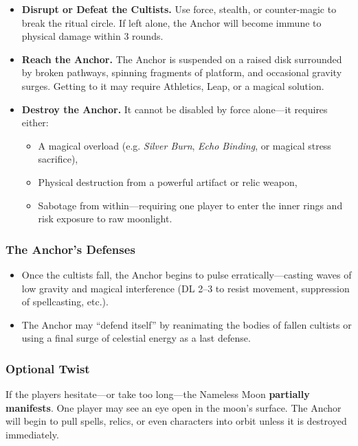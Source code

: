 \begin{itemize}
  \item \textbf{Disrupt or Defeat the Cultists.} Use force, stealth, or counter-magic to break the ritual circle. If left alone, the Anchor will become immune to physical damage within 3 rounds.
  
  \item \textbf{Reach the Anchor.} The Anchor is suspended on a raised disk surrounded by broken pathways, spinning fragments of platform, and occasional gravity surges. Getting to it may require Athletics, Leap, or a magical solution.

  \item \textbf{Destroy the Anchor.} It cannot be disabled by force alone—it requires either:
  \begin{itemize}
    \item A magical overload (e.g. \emph{Silver Burn}, \emph{Echo Binding}, or magical stress sacrifice),
    \item Physical destruction from a powerful artifact or relic weapon,
    \item Sabotage from within—requiring one player to enter the inner rings and risk exposure to raw moonlight.
  \end{itemize}
\end{itemize}

\subsubsection{The Anchor's Defenses}
\begin{itemize}
  \item Once the cultists fall, the Anchor begins to pulse erratically—casting waves of low gravity and magical interference (DL 2–3 to resist movement, suppression of spellcasting, etc.).
  \item The Anchor may “defend itself” by reanimating the bodies of fallen cultists or using a final surge of celestial energy as a last defense.
\end{itemize}

\subsubsection{Optional Twist}
If the players hesitate—or take too long—the Nameless Moon \textbf{partially manifests}. One player may see an eye open in the moon’s surface. The Anchor will begin to pull spells, relics, or even characters into orbit unless it is destroyed immediately.

